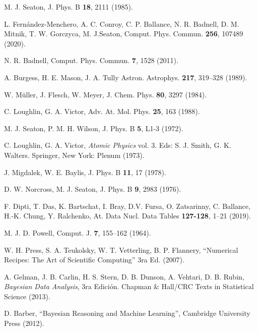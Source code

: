 \begin{thebibliography}{9}
M. J. Seaton, 
J. Phys. B \textbf{18}, 2111 (1985).

L. Fernández-Menchero, A. C. Conroy, C. P. Ballance, N. R. Badnell, 
D. M. Mitnik, T. W. Gorczyca, M. J.Seaton,
Comput. Phys. Commun. \textbf{256}, 107489 (2020).

N. R. Badnell, 
Comput. Phys. Commun. \textbf{7}, 1528 (2011).

A. Burgess, H. E. Mason, J. A. Tully
Astron. Astrophys. \textbf{217}, 319--328 (1989).

W. M\"uller, J. Flesch, W. Meyer,
J. Chem. Phys. \textbf{80}, 3297 (1984).

C. Loughlin, G. A. Victor,
Adv. At. Mol. Phys. \textbf{25}, 163 (1988).

M. J. Seaton, P. M. H. Wilson,
J. Phys. B \textbf{5}, L1-3 (1972).

C. Loughlin, G. A. Victor,
\textit{Atomic Physics} vol. 3. 
Eds: S. J. Smith, G. K. Walters.
Springer, New York: Plenum (1973).

J. Migdalek, W. E. Baylis,
J. Phys. B \textbf{11}, 17 (1978).

D. W. Norcross, M. J. Seaton,
J. Phys. B \textbf{9}, 2983 (1976).

F. Dipti, T. Das, K. Bartschat, I. Bray, D.V. Fursa, O. Zatsarinny, 
C. Ballance, H.-K. Chung, Y. Ralchenko,
‎At. Data Nucl. Data Tables \textbf{127-128}, 1--21 (2019).

M. J. D. Powell, 
Comput. J. \textbf{7}, 155--162 (1964). 

W. H. Press, S. A. Teukolsky, W. T. Vetterling, B. P. Flannery, 
``Numerical Recipes: The Art of Scientific Computing'' 3ra Ed. (2007).


A. Gelman, J. B. Carlin, H. S. Stern, D. B. Dunson, A. Vehtari, 
D. B. Rubin,
\textit{Bayesian Data Analysis}, 3ra Edición. 
Chapman \& Hall/CRC Texts in Statistical Science (2013).

D. Barber, 
``Bayesian Reasoning and Machine Learning'', 
Cambridge University Press (2012).


\end{thebibliography}
